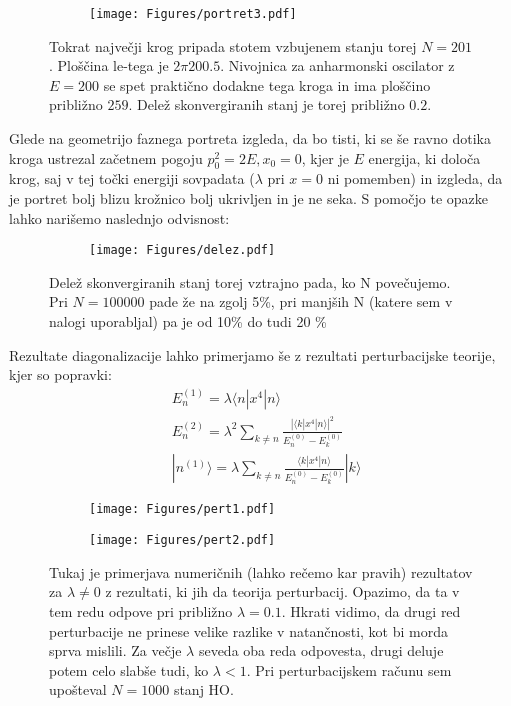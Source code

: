 \documentclass{article}
\begin{document}
\begin{figure}[H]
\centering
\begin{subfigure}{.7\textwidth}
\texttt{[image: Figures/portret3.pdf]}
\end{subfigure}
\caption*{Tokrat največji krog pripada stotem vzbujenem stanju torej $N=201$. Ploščina le-tega je $ 2\pi 200.5$. Nivojnica za anharmonski oscilator z $E=200$ se spet praktično dodakne tega kroga in ima ploščino približno $259$. Delež skonvergiranih stanj je torej približno $0.2$.}
\end{figure}
Glede na geometrijo faznega portreta izgleda, da bo tisti, ki se še ravno dotika kroga ustrezal začetnem pogoju $p_0^2 = 2E, x_0 = 0$, kjer je $E$ energija, ki določa krog, saj v tej točki energiji sovpadata ($\lambda$ pri $x=0$ ni pomemben) in izgleda, da je portret bolj blizu krožnico bolj ukrivljen in je ne seka.  S pomočjo te opazke lahko narišemo naslednjo odvisnost:

\begin{figure}[H]
\centering
\begin{subfigure}{.7\textwidth}
\texttt{[image: Figures/delez.pdf]}
\end{subfigure}
\caption*{Delež skonvergiranih stanj torej vztrajno pada, ko N povečujemo. Pri $N=100000$ pade že na zgolj 5\%, pri manjših N (katere sem v nalogi uporabljal) pa je od 10\%  do tudi 20 \%}
\end{figure}


Rezultate diagonalizacije lahko primerjamo še z rezultati perturbacijske teorije, kjer so popravki:
\begin{align*}
&E_n^{(1)} = \lambda \langle n | x^4 | n \rangle \\
&E_n^{(2)} = \lambda^2 \sum_{k \neq n} \frac{|\langle k | x^4 | n \rangle |^2}{E_n^{(0)} - E_k^{(0)}} \\
&|n^{(1)} \rangle = \lambda \sum_{k \neq n} \frac{\langle k | x^4 | n \rangle}{E_n^{(0)} - E_k^{(0)}} |k \rangle
\end{align*}

\begin{figure}[H]
\centering
\begin{subfigure}{.49\textwidth}
\texttt{[image: Figures/pert1.pdf]}
\end{subfigure}
\begin{subfigure}{.49\textwidth}
\texttt{[image: Figures/pert2.pdf]}
\end{subfigure}
\caption*{Tukaj je primerjava numeričnih (lahko rečemo kar pravih) rezultatov za $\lambda \neq 0$ z rezultati, ki jih da teorija perturbacij. Opazimo, da ta v tem redu odpove pri približno $\lambda = 0.1$. Hkrati vidimo, da drugi red perturbacije ne prinese velike razlike v natančnosti, kot bi morda sprva mislili. Za večje $\lambda$ seveda oba reda odpovesta, drugi deluje potem celo slabše tudi, ko $\lambda < 1$. Pri perturbacijskem računu sem upošteval $N=1000$ stanj HO.}
\end{figure}
\end{document}
